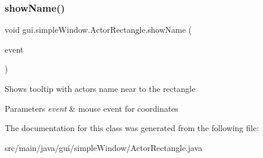 \subsubsection{\texorpdfstring{show\+Name()}{showName()}}
{\footnotesize\ttfamily void gui.\+simple\+Window.\+Actor\+Rectangle.\+show\+Name (\begin{DoxyParamCaption}\item[{Mouse\+Event}]{event }\end{DoxyParamCaption})\hspace{0.3cm}{\ttfamily [private]}}

Shows tooltip with actor\textquotesingle{}s name near to the rectangle 
\begin{DoxyParams}{Parameters}
{\em event} & mouse event for coordinates \\
\hline
\end{DoxyParams}


The documentation for this class was generated from the following file\+:\begin{DoxyCompactItemize}
\item 
src/main/java/gui/simple\+Window/Actor\+Rectangle.\+java\end{DoxyCompactItemize}
